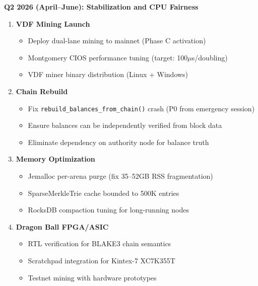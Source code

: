 \documentclass[12pt,a4paper]{article}
\begin{document}
\begin{futurebox}
\textbf{Q2 2026 (April--June): Stabilization and CPU Fairness}

\begin{enumerate}
    \item \textbf{VDF Mining Launch}
    \begin{itemize}
        \item Deploy dual-lane mining to mainnet (Phase C activation)
        \item Montgomery CIOS performance tuning (target: 100$\mu$s/doubling)
        \item VDF miner binary distribution (Linux + Windows)
    \end{itemize}

    \item \textbf{Chain Rebuild}
    \begin{itemize}
        \item Fix \texttt{rebuild\_balances\_from\_chain()} crash (P0 from emergency session)
        \item Ensure balances can be independently verified from block data
        \item Eliminate dependency on authority node for balance truth
    \end{itemize}

    \item \textbf{Memory Optimization}
    \begin{itemize}
        \item Jemalloc per-arena purge (fix 35--52GB RSS fragmentation)
        \item SparseMerkleTrie cache bounded to 500K entries
        \item RocksDB compaction tuning for long-running nodes
    \end{itemize}

    \item \textbf{Dragon Ball FPGA/ASIC}
    \begin{itemize}
        \item RTL verification for BLAKE3 chain semantics
        \item Scratchpad integration for Kintex-7 XC7K355T
        \item Testnet mining with hardware prototypes
    \end{itemize}
\end{enumerate}
\end{futurebox}
\end{document}
